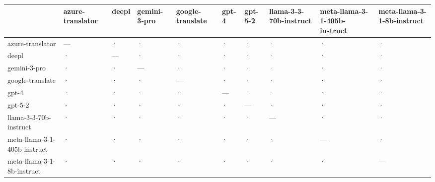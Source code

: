 \begin{tabular}{llllllllll}
\toprule
 & azure-translator & deepl & gemini-3-pro & google-translate & gpt-4 & gpt-5-2 & llama-3-3-70b-instruct & meta-llama-3-1-405b-instruct & meta-llama-3-1-8b-instruct \\
\midrule
azure-translator & — & · & · & · & · & · & · & · & · \\
deepl & · & — & · & · & · & · & · & · & · \\
gemini-3-pro & · & · & — & · & · & · & · & · & · \\
google-translate & · & · & · & — & · & · & · & · & · \\
gpt-4 & · & · & · & · & — & · & · & · & · \\
gpt-5-2 & · & · & · & · & · & — & · & · & · \\
llama-3-3-70b-instruct & · & · & · & · & · & · & — & · & · \\
meta-llama-3-1-405b-instruct & · & · & · & · & · & · & · & — & · \\
meta-llama-3-1-8b-instruct & · & · & · & · & · & · & · & · & — \\
\bottomrule
\end{tabular}
